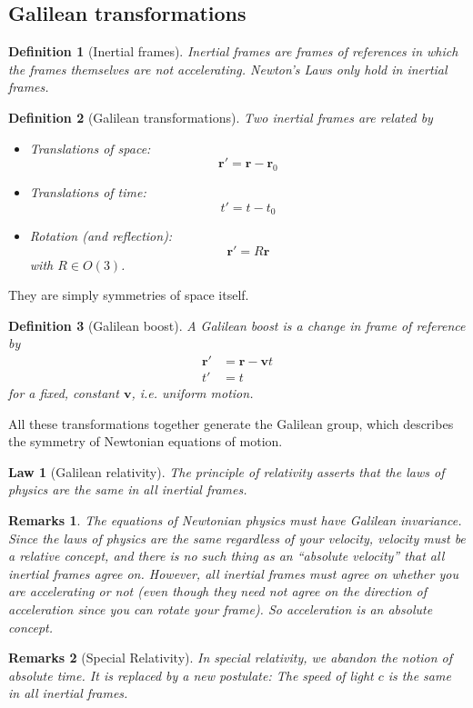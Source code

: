\documentclass[a4paper]{article}
\newtheorem{remarks}{Remarks}[section]
\theoremstyle{new}
\newtheorem{law}{Law}[section]
\newtheorem{defi}{Definition}[section]
\begin{document}
\subsection{Galilean transformations}
\begin{defi}[Inertial frames]
  Inertial frames are frames of references in which the frames themselves are not accelerating. Newton's Laws only hold in inertial frames.
\end{defi}
\begin{defi}[Galilean transformations]
  Two inertial frames are related by
  \begin{itemize}
  \item Translations of space:
    \[
      \mathbf{r}' = \mathbf{r} - \mathbf{r}_0
    \]
  \item Translations of time:
    \[
      t' = t - t_0
    \]
  \item Rotation (and reflection):
    \[
      \mathbf{r}' = R\mathbf{r}
    \]
    with $R\in O(3)$.
\end{itemize}
\end{defi}
They are simply symmetries of space itself.
\begin{defi}[Galilean boost]
  A Galilean boost is a change in frame of reference by
  \begin{align*}
    \mathbf{r}' &= \mathbf{r} - \mathbf{v}t\\
    t' &= t
  \end{align*}
  for a fixed, constant $\mathbf{v}$, i.e. uniform motion.
\end{defi}
All these transformations together generate the Galilean group, which describes the symmetry of Newtonian equations of motion.
\begin{law}[Galilean relativity]
  The principle of relativity asserts that the laws of physics are the same in all inertial frames.
\end{law}
\begin{remarks}
The equations of Newtonian physics must have Galilean invariance. Since the laws of physics are the same regardless of your velocity, velocity must be a relative concept, and there is no such thing as an ``absolute velocity'' that all inertial frames agree on. However, all inertial frames must agree on whether you are accelerating or not (even though they need not agree on the direction of acceleration since you can rotate your frame). So acceleration is an absolute concept.
\end{remarks}
\begin{remarks}[Special Relativity]
In special relativity, we abandon the notion of absolute time. It is replaced by a new postulate: The speed of light $c$ is the same in all inertial frames.
\end{remarks}
\end{document}
